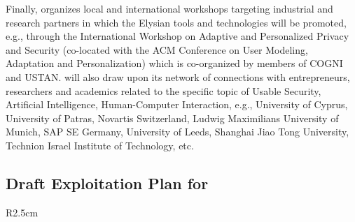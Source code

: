 \documentclass[a4paper,11pt]{article}
\newcommand{\project}[1]{\textbf{#1}\xspace}
\newcommand{\SECURITY}{\project{Elysian}}
\newcommand{\TheProject}{\SECURITY}
\begin{document}
Finally, \COGNIshort{} organizes local and international workshops targeting industrial and research partners in which the Elysian tools and technologies will be promoted, e.g., through the International Workshop on Adaptive and Personalized Privacy and Security (co-located with the ACM Conference on User Modeling, Adaptation and Personalization) which is co-organized by members of COGNI and USTAN. \COGNIshort{} will also draw upon its network of connections with entrepreneurs, researchers and academics related to the specific topic of Usable Security, Artificial Intelligence, Human-Computer Interaction, e.g., University of Cyprus, University of Patras, Novartis Switzerland, Ludwig Maximilians University of Munich, SAP SE Germany, University of Leeds, Shanghai Jiao Tong University, Technion Israel Institute of Technology, etc.


\horizontalline

\subsection*{Draft Exploitation Plan for \SAshort{}}

\begin{wrapfigure}{R}{2.5cm}
\vspace{-1.4cm}
\hfill {}
\vspace{-0.9cm}
\end{wrapfigure}
\end{document}
